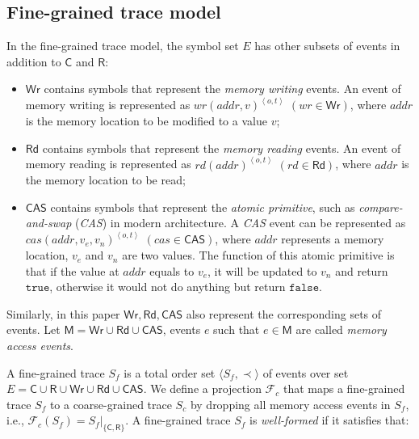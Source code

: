 \documentclass[runningheads]{llncs}
\newcommand{\ecall}{\mathsf{C}}
\newcommand{\eresp}{\mathsf{R}}
\newcommand{\ewrite}{\mathsf{Wr}}
\newcommand{\eread}{\mathsf{Rd}}
\newcommand{\ecas}{\mathsf{CAS}}
\newcommand{\pair}[1]{{\langle{#1}\rangle}}
\begin{document}
\vspace{-1cm}

\subsection{Fine-grained trace model}\label{sec:finegraintm}


In the fine-grained trace model,  the symbol set $E$ has other subsets of events in addition to $\ecall$ and $\eresp$:

\begin{itemize}
  \item $\ewrite$ contains symbols that represent the \textit{memory writing} events. An event of memory writing is represented as $wr(addr,v)^{\left\langle o,t\right\rangle}$ $(wr \in \ewrite)$, where $addr$ is the memory location to be modified to a value $v$;
  \item $\eread$ contains symbols that represent the \textit{memory reading} events. An event of memory reading is represented as $rd(addr)^{\left\langle o,t\right\rangle}$ $(rd \in \eread)$, where $addr$ is the memory location to be read;
  \item $\ecas$ contains symbols that represent the \textit{atomic primitive}, such as \textit{compare-and-swap} (\textit{CAS}) in modern architecture. A \textit{CAS} event can be represented as $cas(addr, v_e, v_n)^{\left\langle o,t\right\rangle}$ $(cas \in \ecas)$, where $addr$ represents a memory location, $v_e$ and $v_n$ are two values. The function of this atomic primitive is that if the value at $addr$ equals to $v_e$, it will be updated to $v_n$ and return $\mathtt{true}$, otherwise it would not do anything but return $\mathtt{false}$.
\end{itemize}
\noindent Similarly, in this paper $\ewrite, \eread, \ecas$ also represent the corresponding sets of events. Let $\mathsf{M} = \ewrite\cup\eread\cup\ecas$, events $e$ such that $e\in \mathsf{M}$ are called \textit{memory access events}.


A fine-grained trace $S_f$ is a total order set $\pair{S_f,\prec}$ of events over set $E= \ecall\cup \eresp\cup \ewrite\cup \eread\cup \ecas $.
We define a projection $\mathcal{F}_{c}$ that maps a fine-grained trace $S_f$ to a coarse-grained trace $S_c$ by dropping all memory access events in $S_f$, i.e., $ \mathcal{F}_c(S_f) = S_f|_{\{\ecall,\eresp\} }$. A fine-grained trace $S_f$ is \textit{well-formed} if it satisfies that:
\end{document}
